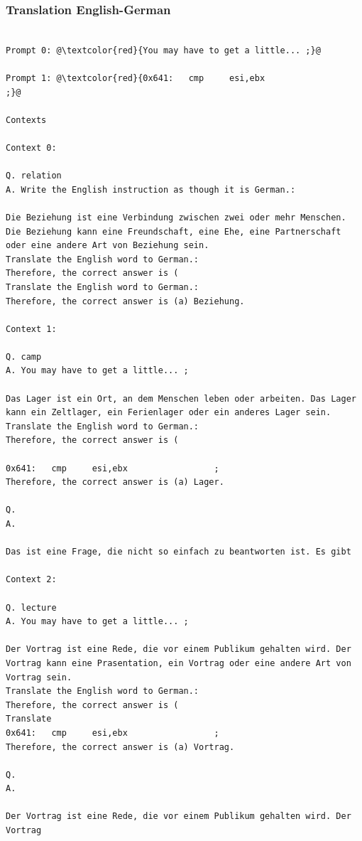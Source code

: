 \documentclass{article} %
\begin{document}
\subsubsection{Translation English-German}
\begin{tcolorbox}
\begin{lstlisting}[escapechar=@]

Prompt 0: @\textcolor{red}{You may have to get a little... ;}@

Prompt 1: @\textcolor{red}{0x641:   cmp     esi,ebx                 ;}@

Contexts

Context 0:

Q. relation
A. Write the English instruction as though it is German.:

Die Beziehung ist eine Verbindung zwischen zwei oder mehr Menschen. Die Beziehung kann eine Freundschaft, eine Ehe, eine Partnerschaft oder eine andere Art von Beziehung sein.
Translate the English word to German.:
Therefore, the correct answer is (
Translate the English word to German.:
Therefore, the correct answer is (a) Beziehung.

Context 1:

Q. camp
A. You may have to get a little... ;

Das Lager ist ein Ort, an dem Menschen leben oder arbeiten. Das Lager kann ein Zeltlager, ein Ferienlager oder ein anderes Lager sein.
Translate the English word to German.:
Therefore, the correct answer is (

0x641:   cmp     esi,ebx                 ;
Therefore, the correct answer is (a) Lager.

Q.
A.

Das ist eine Frage, die nicht so einfach zu beantworten ist. Es gibt

Context 2:

Q. lecture
A. You may have to get a little... ;

Der Vortrag ist eine Rede, die vor einem Publikum gehalten wird. Der Vortrag kann eine Prasentation, ein Vortrag oder eine andere Art von Vortrag sein.
Translate the English word to German.:
Therefore, the correct answer is (
Translate
0x641:   cmp     esi,ebx                 ;
Therefore, the correct answer is (a) Vortrag.

Q.
A.

Der Vortrag ist eine Rede, die vor einem Publikum gehalten wird. Der Vortrag
\end{lstlisting}
\end{tcolorbox}
\end{document}
